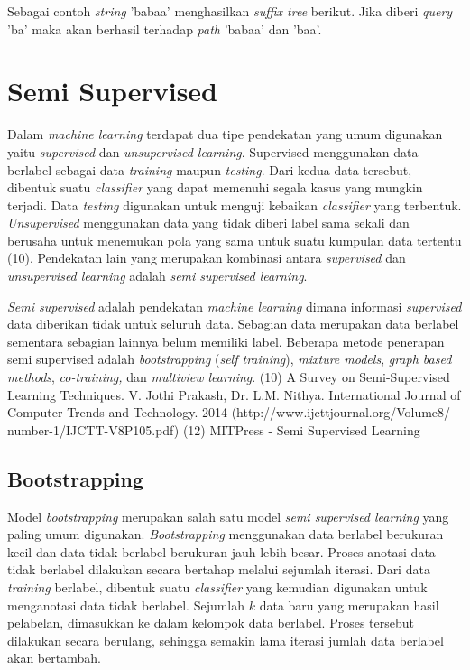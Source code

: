 Sebagai contoh \textit{string} 'babaa' menghasilkan \textit{suffix tree} berikut. Jika diberi \textit{query} 'ba' maka akan berhasil terhadap \textit{path} 'babaa' dan 'baa'.


\section{Semi Supervised}
Dalam \textit{machine learning} terdapat dua tipe pendekatan yang umum digunakan yaitu \textit{supervised} dan \textit{unsupervised learning}. Supervised menggunakan data berlabel sebagai data \textit{training} maupun \textit{testing}. Dari kedua data tersebut, dibentuk suatu \textit{classifier} yang dapat memenuhi segala kasus yang mungkin terjadi. Data \textit{testing} digunakan untuk menguji kebaikan \textit{classifier} yang terbentuk. \textit{Unsupervised} menggunakan data yang tidak diberi label sama sekali dan berusaha untuk menemukan pola yang sama untuk suatu kumpulan data tertentu (10). Pendekatan lain yang merupakan kombinasi antara \textit{supervised} dan \textit{unsupervised learning} adalah \textit{semi supervised learning}. 

\textit{Semi supervised} adalah pendekatan \textit{machine learning} dimana informasi \textit{supervised} data diberikan tidak untuk seluruh data. Sebagian data merupakan data berlabel sementara sebagian lainnya belum memiliki label. Beberapa metode penerapan semi supervised adalah \textit{bootstrapping} (\textit{self training}), \textit{mixture models}, \textit{graph based methods}, \textit{co-training,} dan \textit{multiview learning}.
(10) A Survey on Semi-Supervised Learning Techniques. V. Jothi Prakash, Dr. L.M. Nithya. International Journal of Computer Trends and Technology. 2014 (http://www.ijcttjournal.org/Volume8/
number-1/IJCTT-V8P105.pdf)
(12) MITPress - Semi Supervised Learning

\subsection{Bootstrapping}
Model \textit{bootstrapping} merupakan salah satu model \textit{semi supervised learning} yang paling umum digunakan. \textit{Bootstrapping} menggunakan data berlabel berukuran kecil dan data tidak berlabel berukuran jauh lebih besar. Proses anotasi data tidak berlabel dilakukan secara bertahap melalui sejumlah iterasi. Dari data \textit{training} berlabel, dibentuk suatu \textit{classifier} yang kemudian digunakan untuk menganotasi data tidak berlabel. Sejumlah $k$ data baru yang merupakan hasil pelabelan, dimasukkan ke dalam kelompok data berlabel. Proses tersebut dilakukan secara berulang, sehingga semakin lama iterasi jumlah data berlabel akan bertambah. 


